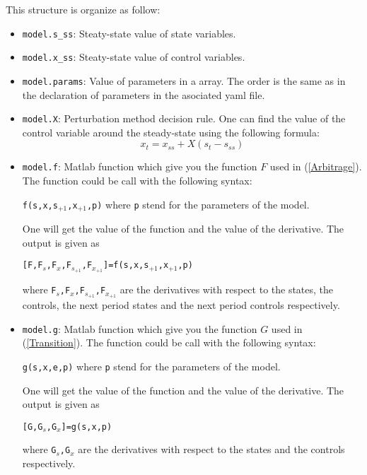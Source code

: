 \documentclass[12pt]{article}
\begin{document}
This structure is organize as follow:
\begin{itemize}
	\item \texttt{model.s\_ss}: Steaty-state value of state variables.
	\item \texttt{model.x\_ss}: Steaty-state value of control variables.
	\item \texttt{model.params}: Value of parameters in a array. The order is the same as in the declaration of parameters in the asociated yaml file.
	\item \texttt{model.X}: Perturbation method decision rule. One can find the value of the control variable around the steady-state using the following formula:
	\begin{equation*}
	x_t=x_{ss}+ X(s_t-s_{ss})
	\end{equation*}
	\item \texttt{model.f}: Matlab function which give you the function $F$ used in (\ref{Arbitrage}). The function could be call with the following syntax:
	
	 \begin{center} \texttt{f(s,x,s$_{+1}$,x$_{+1}$,p)} where \texttt{p} stend for the parameters of the model.\end{center}
	 
	 One will get the value of the function and the value of the derivative. The output is given as 
	 
	 \begin{center} \texttt{[F,F$_s$,F$_x$,F$_{s_{+1}}$,F$_{x_{+1}}$]=f(s,x,s$_{+1}$,x$_{+1}$,p)}\end{center} 
	 where \texttt{F$_s$,F$_x$,F$_{s_{+1}}$,F$_{x_{+1}}$} are the derivatives with respect to the states, the controls, the next period states and the next period controls respectively.
	
	\item \texttt{model.g}: Matlab function which give you the function $G$ used in (\ref{Transition}). The function could be call with the following syntax:
	
		 \begin{center} \texttt{g(s,x,e,p)} where \texttt{p} stend for the parameters of the model.\end{center}
	
		 One will get the value of the function and the value of the derivative. The output is given as 
	 
	 \begin{center} \texttt{[G,G$_s$,G$_x$]=g(s,x,p)}\end{center}
	 where \texttt{G$_s$,G$_x$} are the derivatives with respect to the states and the controls respectively.
	
	
	\end{itemize}
\end{document}
